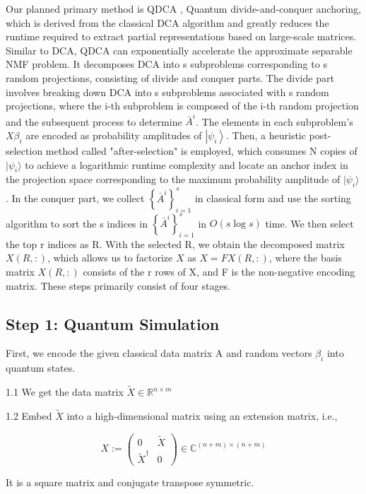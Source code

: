 \documentclass[12pt]{article}
\begin{document}
Our planned primary method is QDCA \cite{du2018quantum}, Quantum divide-and-conquer anchoring, which is derived from the classical DCA algorithm and greatly reduces the runtime required to extract partial representations based on large-scale matrices. Similar to DCA, QDCA can exponentially accelerate the approximate separable NMF problem. It decomposes DCA into s subproblems corresponding to s random projections, consisting of divide and conquer parts. The divide part involves breaking down DCA into s subproblems associated with s random projections, where the i-th subproblem is composed of the i-th random projection and the subsequent process to determine $\bar{A}^{i}$. The elements in each subproblem's $X \beta_{i}$ are encoded as probability amplitudes of $\left|\psi_{i}\right\rangle$. Then, a heuristic post-selection method called "after-selection" is employed, which consumes N copies of $|\psi_{i}\rangle$ to achieve a logarithmic runtime complexity and locate an anchor index in the projection space corresponding to the maximum probability amplitude of $|\psi_{i}\rangle$. In the conquer part, we collect $\left\{\bar{A}^{i}\right\}_{i=1}^{s}$ in classical form and use the sorting algorithm \cite{knuth1997art} to sort the s indices in $\left\{\bar{A}^{i}\right\}_{i=1}^{s}$ in $O(s \log s)$ time. We then select the top r indices as R. With the selected R, we obtain the decomposed matrix $X(R,:)$, which allows us to factorize $X$ as $X=F X(R,:)$, where the basis matrix $X(R,:)$ consists of the r rows of X, and F is the non-negative encoding matrix. These steps primarily consist of four stages.

\subsection{Step 1: Quantum Simulation}

First, we encode the given classical data matrix A and random vectors $\beta_i$ into quantum states.

1.1 We get the data matrix $\tilde{X} \in \mathbb{R}^{n \times m}$

1.2 Embed $\tilde{X}$ into a high-dimensional matrix using an extension matrix, i.e.,

$$
X:=\left(\begin{array}{cc}
0 & \tilde{X} \\
\tilde{X}^{\dagger} & 0
\end{array}\right) \in \mathbb{C}^{(n+m) \times(n+m)}
$$

It is a square matrix and conjugate transpose symmetric.
\end{document}
